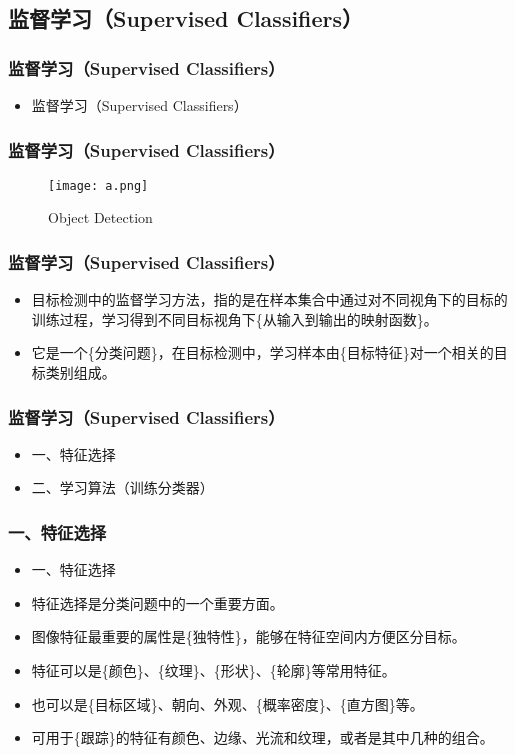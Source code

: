 \documentclass[notheorems,mathserif,table,compress]{beamer}  %
\begin{document}
\subsection{监督学习（Supervised Classifiers）}

\begin{frame}
  \frametitle{监督学习（Supervised Classifiers）}  
  \begin{itemize}
  \item 监督学习（Supervised Classifiers）
  \end{itemize}
\end{frame}

\begin{frame}
  \frametitle{监督学习（Supervised Classifiers）}  
  \begin{figure}[!ht]
  \centering\texttt{[image: a.png]}
  \caption{Object Detection}
  \end{figure}
\end{frame}

\begin{frame}
  \frametitle{监督学习（Supervised Classifiers）}
  \begin{itemize}
  \item 目标检测中的监督学习方法，指的是在样本集合中通过对不同视角下的目标的训练过程，学习得到不同目标视角下\{从输入到输出的映射函数\}。
  \item 它是一个\{分类问题\}，在目标检测中，学习样本由\{目标特征\}对一个相关的目标类别组成。
  \end{itemize}
\end{frame}

\begin{frame}
  \frametitle{监督学习（Supervised Classifiers）}
  \begin{itemize}
  \item 一、特征选择
  \item 二、学习算法（训练分类器）
  \end{itemize}
\end{frame}%

\begin{frame}
  \frametitle{一、特征选择}
  \begin{itemize}
  \item 一、特征选择
  \item 特征选择是分类问题中的一个重要方面。
  \item 图像特征最重要的属性是\{独特性\}，能够在特征空间内方便区分目标。
  \item 特征可以是\{颜色\}、\{纹理\}、\{形状\}、\{轮廓\}等常用特征。
  \item 也可以是\{目标区域\}、朝向、外观、\{概率密度\}、\{直方图\}等。
  \item 可用于\{跟踪\}的特征有颜色、边缘、光流和纹理，或者是其中几种的组合。
  \end{itemize}
\end{frame}
\end{document}
